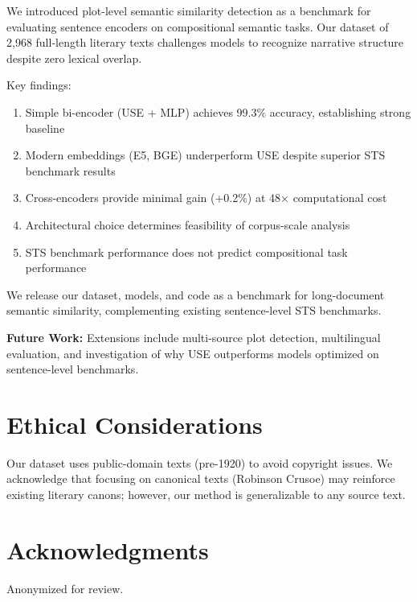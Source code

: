 \documentclass[11pt,a4paper]{article}
\begin{document}
We introduced plot-level semantic similarity detection as a benchmark for evaluating sentence encoders on compositional semantic tasks. Our dataset of 2,968 full-length literary texts challenges models to recognize narrative structure despite zero lexical overlap.

Key findings:

\begin{enumerate}
    \item Simple bi-encoder (USE + MLP) achieves 99.3\% accuracy, establishing strong baseline
    \item Modern embeddings (E5, BGE) underperform USE despite superior STS benchmark results
    \item Cross-encoders provide minimal gain (+0.2\%) at 48× computational cost
    \item Architectural choice determines feasibility of corpus-scale analysis
    \item STS benchmark performance does not predict compositional task performance
\end{enumerate}

We release our dataset, models, and code as a benchmark for long-document semantic similarity, complementing existing sentence-level STS benchmarks.

\textbf{Future Work:} Extensions include multi-source plot detection, multilingual evaluation, and investigation of why USE outperforms models optimized on sentence-level benchmarks.

\section*{Ethical Considerations}

Our dataset uses public-domain texts (pre-1920) to avoid copyright issues. We acknowledge that focusing on canonical texts (Robinson Crusoe) may reinforce existing literary canons; however, our method is generalizable to any source text.

\section*{Acknowledgments}

Anonymized for review.



\end{document}
